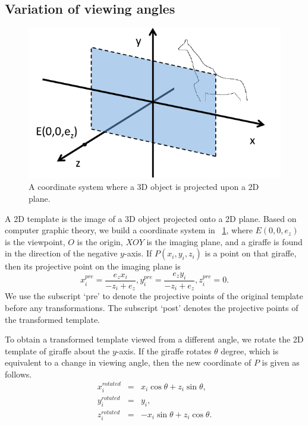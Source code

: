 \documentclass[journal]{IEEEtran}
\begin{document}
\subsection{Variation of viewing angles}

\begin{figure}[!t]
\centering
\includegraphics[width=0.7\linewidth]{images/fig17.pdf}
\caption{A coordinate system where a 3D object is projected upon a 2D plane.}
\label{fig:17}
\end{figure}

A 2D template is the image of a 3D object projected onto a 2D plane. 
Based on computer graphic theory, we build a coordinate system in \figurename~\ref{fig:17}, 
where $E(0,0,e_z)$ is the viewpoint, $O$ is the origin, $XOY$ is the imaging plane, 
and a giraffe is found in the direction of the negative $y$-axis.
If $P(x_i,y_i,z_i)$ is a point on that giraffe, 
then its projective point on the imaging plane is
\begin{equation}
x_i^{pre}=\frac{e_z x_i}{-z_i+e_z}, y_i^{pre}=\frac{e_z y_i}{-z_i+e_z}, z_i^{pre}=0.
\label{eqn:2}
\end{equation}
We use the subscript `pre' to denote the projective points of the original template before any transformations.
The subscript `post' denotes the projective points of the transformed template.

To obtain a transformed template viewed from a different angle,
we rotate the 2D template of giraffe about the $y$-axis.
If the giraffe rotates $\theta$ degree, which is equivalent to a change in viewing angle, 
then the new coordinate of $P$ is given as follows. 
\begin{eqnarray}
x_i^{rotated}&=&x_i \cos\theta+z_i \sin\theta, \nonumber\\
y_i^{rotated}&=&y_i, \nonumber\\
z_i^{rotated}&=&-x_i \sin\theta+z_i \cos\theta. 
\end{eqnarray}
\end{document}

